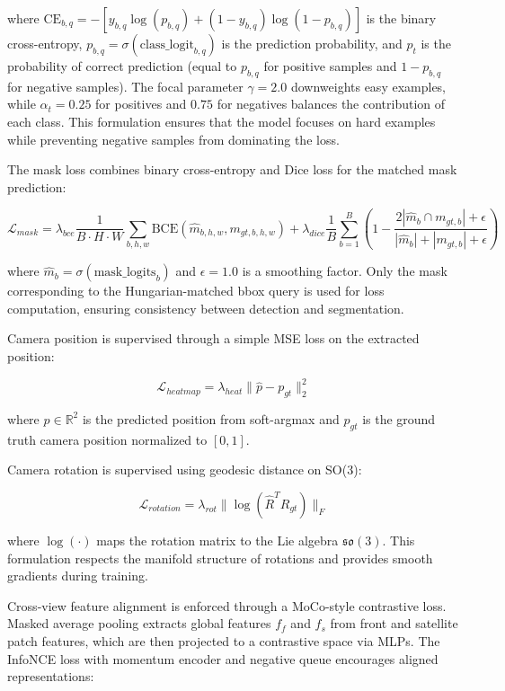 where $\text{CE}_{b,q} = -[y_{b,q} \log(p_{b,q}) + (1-y_{b,q}) \log(1-p_{b,q})]$ is the binary cross-entropy, $p_{b,q} = \sigma(\text{class\_logit}_{b,q})$ is the prediction probability, and $p_t$ is the probability of correct prediction (equal to $p_{b,q}$ for positive samples and $1-p_{b,q}$ for negative samples). The focal parameter $\gamma = 2.0$ downweights easy examples, while $\alpha_t = 0.25$ for positives and $0.75$ for negatives balances the contribution of each class. This formulation ensures that the model focuses on hard examples while preventing negative samples from dominating the loss.

The mask loss combines binary cross-entropy and Dice loss for the matched mask prediction:

\begin{equation}
\mathcal{L}_{mask} = \lambda_{bce} \frac{1}{B \cdot H \cdot W} \sum_{b,h,w} \text{BCE}(\hat{m}_{b,h,w}, m_{gt,b,h,w}) + \lambda_{dice} \frac{1}{B} \sum_{b=1}^{B} \left(1 - \frac{2|\hat{m}_b \cap m_{gt,b}| + \epsilon}{|\hat{m}_b| + |m_{gt,b}| + \epsilon}\right)
\end{equation}

where $\hat{m}_b = \sigma(\text{mask\_logits}_b)$ and $\epsilon = 1.0$ is a smoothing factor. Only the mask corresponding to the Hungarian-matched bbox query is used for loss computation, ensuring consistency between detection and segmentation.

Camera position is supervised through a simple MSE loss on the extracted position:

\begin{equation}
\mathcal{L}_{heatmap} = \lambda_{heat} \|\hat{p} - p_{gt}\|_2^2
\end{equation}

where $\hat{p} \in \mathbb{R}^2$ is the predicted position from soft-argmax and $p_{gt}$ is the ground truth camera position normalized to $[0,1]$.

Camera rotation is supervised using geodesic distance on SO(3):

\begin{equation}
\mathcal{L}_{rotation} = \lambda_{rot} \|\log(\hat{R}^T R_{gt})\|_F
\end{equation}

where $\log(\cdot)$ maps the rotation matrix to the Lie algebra $\mathfrak{so}(3)$. This formulation respects the manifold structure of rotations and provides smooth gradients during training.

Cross-view feature alignment is enforced through a MoCo-style contrastive loss. Masked average pooling extracts global features $f_f$ and $f_s$ from front and satellite patch features, which are then projected to a contrastive space via MLPs. The InfoNCE loss with momentum encoder and negative queue encourages aligned representations:

